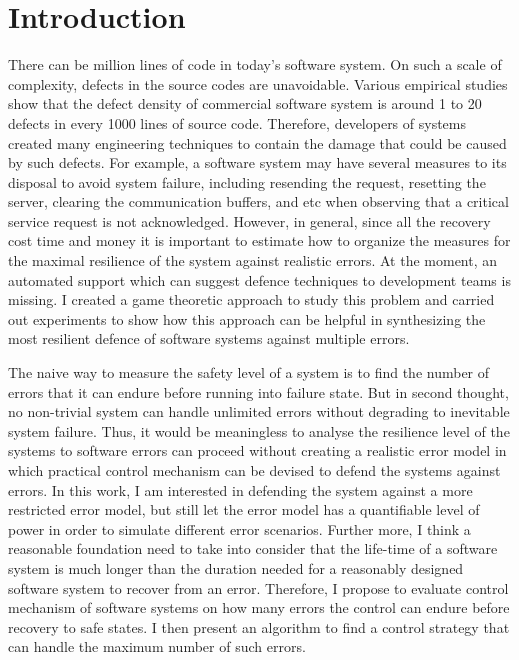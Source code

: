 \chapter{Introduction}
\label{c:intro}

There can be million lines of code in today's software system.
On such a scale of complexity, defects in the source codes are unavoidable.  
Various empirical studies show that the defect density of commercial software system is around 1 to 20 defects in every 1000 lines of source code\cite{Sommerville:2006:SE:1196763}.
Therefore, developers of systems created many engineering techniques to contain the damage that could be caused by such defects.
For example, a software system may have several measures to its disposal to avoid system failure, including resending the request, resetting the server, clearing the communication buffers, and etc when observing that a critical service request is not acknowledged.
However, in general, since all the recovery cost time and money it is important to estimate how to organize the measures for the maximal resilience of the system against realistic errors.
At the moment, an automated support which can suggest defence techniques to development teams is missing.
I created a game theoretic approach to study this problem and carried out experiments to show how this approach can be helpful in  synthesizing the most resilient defence of software systems against multiple errors.

The naive way to measure the safety level of a system is to find the number of errors that it can endure before running into failure state.
But in second thought, no non-trivial system can handle unlimited errors without degrading to inevitable system failure.
Thus, it would be meaningless to analyse the resilience level of the systems to software errors can proceed without creating a realistic error model in which practical control mechanism can be devised to defend the systems against errors.
In this work, I am interested in defending the system against a more restricted error model, but still let the error model has a quantifiable level of power in order to simulate different error scenarios.
Further more, I think a reasonable foundation need to take into consider that the life-time of a software system is much longer than the duration needed for a reasonably designed software system to recover from an error.
Therefore, I propose to evaluate control mechanism of software systems on how many errors the control can endure before recovery to safe states.
I then present an algorithm to find a control strategy that can handle the maximum number of such errors.

